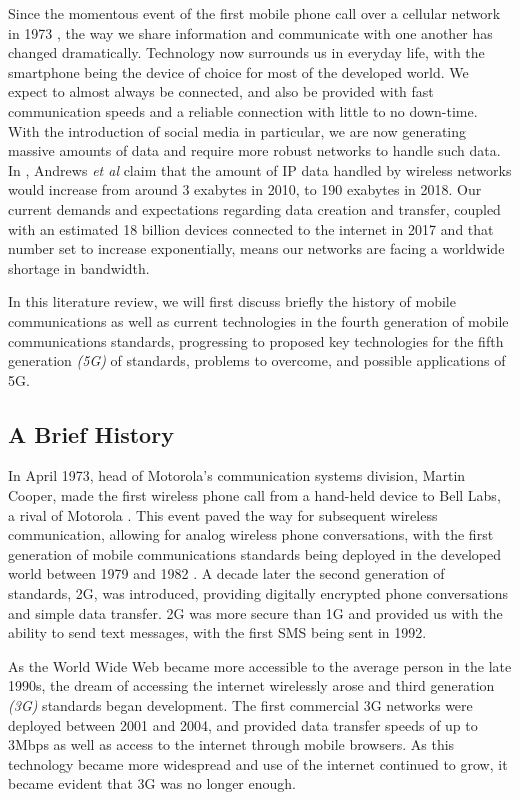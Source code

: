\documentclass[journal]{IEEEtran}
\begin{document}
Since the momentous event of the first mobile phone call over a cellular network in 1973 \cite{tomfarhist}, the way we share information and communicate with one another has changed dramatically. Technology now surrounds us in everyday life, with the smartphone being the device of choice for most of the developed world. We expect to almost always be connected, and also be provided with fast communication speeds and a reliable connection with little to no down-time. With the introduction of social media in particular, we are now generating massive amounts of data and require more robust networks to handle such data. In \cite{whatwill5gbe}, Andrews \textit{et al} claim that the amount of IP data handled by wireless networks would increase from around 3 exabytes in 2010, to 190 exabytes in 2018. Our current demands and expectations regarding data creation and transfer, coupled with an estimated 18 billion devices connected to the internet in 2017 \cite{ericssondev} and that number set to increase exponentially, means our networks are facing a worldwide shortage in bandwidth.

In this literature review, we will first discuss briefly the history of mobile communications as well as current technologies in the fourth generation of mobile communications standards, progressing to proposed key technologies for the fifth generation \textit{(5G)} of standards, problems to overcome, and possible applications of 5G.

\subsection{A Brief History}
In April 1973, head of Motorola's communication systems division, Martin Cooper, made the first wireless phone call from a hand-held device to Bell Labs, a rival of Motorola \cite{tomfarhist}. This event paved the way for subsequent wireless communication, allowing for analog wireless phone conversations, with the first generation of mobile communications standards being deployed in the developed world between 1979 and 1982 \cite{evolution}. A decade later the second generation of standards, 2G, was introduced, providing digitally encrypted phone conversations and simple data transfer. 2G was more secure than 1G and provided us with the ability to send text messages, with the first SMS being sent in 1992. 

As the World Wide Web became more accessible to the average person in the late 1990s, the dream of accessing the internet wirelessly arose and third generation \textit{(3G)} standards began development. The first commercial 3G networks were deployed between 2001 and 2004, and provided data transfer speeds of up to 3Mbps \cite{tomfarhist} as well as access to the internet through mobile browsers. As this technology became more widespread and use of the internet continued to grow, it became evident that 3G was no longer enough.
\end{document}
